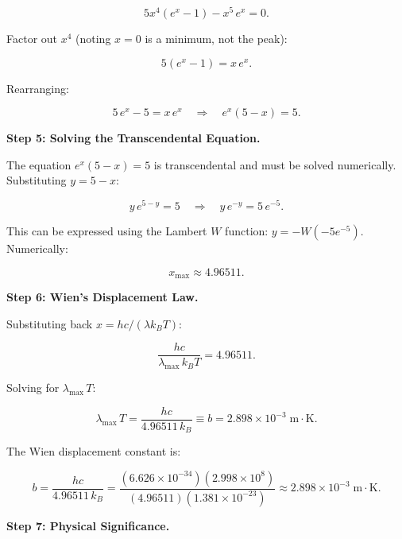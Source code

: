 \begin{equation}
5x^4(e^x - 1) - x^5\,e^x = 0.
\end{equation}

Factor out $x^4$ (noting $x = 0$ is a minimum, not the peak):

\begin{equation}
5(e^x - 1) = x\,e^x.
\end{equation}

Rearranging:

\begin{equation}
5\,e^x - 5 = x\,e^x \quad \Longrightarrow \quad e^x(5 - x) = 5.
\end{equation}

\textbf{Step 5: Solving the Transcendental Equation.}

The equation $e^x(5 - x) = 5$ is transcendental and must be solved numerically. Substituting $y = 5 - x$:

\begin{equation}
y\,e^{5-y} = 5 \quad \Longrightarrow \quad y\,e^{-y} = 5\,e^{-5}.
\end{equation}

This can be expressed using the Lambert $W$ function: $y = -W(-5e^{-5})$. Numerically:

\begin{equation}
x_{\max} \approx 4.96511.
\end{equation}

\textbf{Step 6: Wien's Displacement Law.}

Substituting back $x = hc/(\lambda k_B T)$:

\begin{equation}
\frac{hc}{\lambda_{\max}\,k_B T} = 4.96511.
\end{equation}

Solving for $\lambda_{\max}\,T$:

\begin{equation}
\boxed{\lambda_{\max}\,T = \frac{hc}{4.96511\,k_B} \equiv b = 2.898 \times 10^{-3}\;\text{m}\cdot\text{K}.}
\end{equation}

The Wien displacement constant is:

\begin{equation}
b = \frac{hc}{4.96511\,k_B} = \frac{(6.626\times10^{-34})(2.998\times10^8)}{(4.96511)(1.381\times10^{-23})} \approx 2.898\times10^{-3}\;\text{m}\cdot\text{K}.
\end{equation}

\textbf{Step 7: Physical Significance.}

